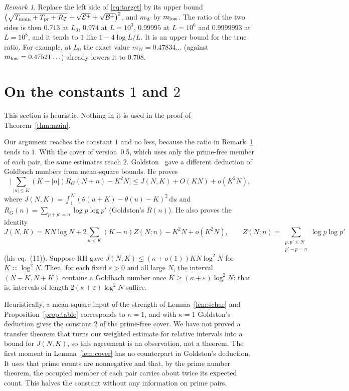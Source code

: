 \documentclass[11pt]{amsart}
\theoremstyle{remark}
\newtheorem{remark}[theorem]{Remark}
\newcommand{\dd}{\,\mathrm{d}}
\begin{document}
\begin{remark}\label{rem:ratio}
Replace the left side of \eqref{eq:target} by its upper bound $\big(\sqrt{T_{\rm main}+T_{\rm pr}+R_T}+\sqrt{\mathcal E^+}+\sqrt{\mathcal B^+}\big)^2$, and $m_W$ by $m_{\rm low}$. The ratio of the two sides is then $0.713$ at $L_0$, $0.974$ at $L=10^3$, $0.99995$ at $L=10^6$ and $0.9999993$ at $L=10^8$, and it tends to $1$ like $1-4\log L/L$. It is an upper bound for the true ratio. For example, at $L_0$ the exact value $m_W=0.47834\ldots$ (against $m_{\rm low}=0.47521\ldots$) already lowers it to $0.708$.
\end{remark}

\section{On the constants $1$ and $2$}\label{sec:optimality}

This section is heuristic. Nothing in it is used in the proof of Theorem~\ref{thm:main}.

Our argument reaches the constant $1$ and no less, because the ratio in Remark~\ref{rem:ratio} tends to $1$. With the cover of version~0.5, which uses only the prime-free member of each pair, the same estimates reach $2$. Goldston~\cite{Goldston} gave a different deduction of Goldbach numbers from mean-square bounds. He proves~\cite[Theorem, eq.~(6)]{Goldston}
\[
\Big|\sum_{|n|\le K}(K-|n|)R_G(N+n)-K^2N\Big|\le J(N,K)+O(KN)+o(K^2N),
\]
where $J(N,K)=\int_1^N(\theta(u+K)-\theta(u)-K)^2\dd u$ and $R_G(n)=\sum_{p+p'=n}\log p\log p'$ (Goldston's $R(n)$). He also proves the identity~\cite[eq.~(25)]{Goldston}
\[
J(N,K)=KN\log N+2\sum_{n<K}(K-n)Z(N;n)-K^2N+o(K^2N),\qquad Z(N;n)=\sum_{\substack{p,p'\le N\\ p'-p=n}}\log p\log p'
\]
(his eq.~(11)). Suppose RH gave $J(N,K)\le(\kappa+o(1))KN\log^2N$ for $K\asymp\log^2N$. Then, for each fixed $\varepsilon>0$ and all large $N$, the interval $(N-K,N+K)$ contains a Goldbach number once $K\ge(\kappa+\varepsilon)\log^2N$; that is, intervals of length $2(\kappa+\varepsilon)\log^2N$ suffice.

Heuristically, a mean-square input of the strength of Lemma~\ref{lem:schur} and Proposition~\ref{prop:table} corresponds to $\kappa=1$, and with $\kappa=1$ Goldston's deduction gives the constant $2$ of the prime-free cover. We have not proved a transfer theorem that turns our weighted estimate for relative intervals into a bound for $J(N,K)$, so this agreement is an observation, not a theorem. The first moment in Lemma~\ref{lem:cover} has no counterpart in Goldston's deduction. It uses that prime counts are nonnegative and that, by the prime number theorem, the occupied member of each pair carries about twice its expected count. This halves the constant without any information on prime pairs.
\end{document}
